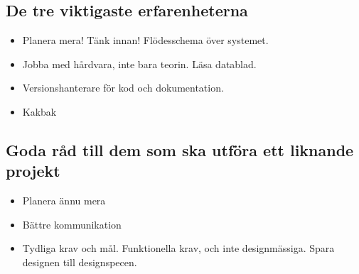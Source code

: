 \documentclass[a4paper,12pt]{article}
\begin{document}
\subsection{De tre viktigaste erfarenheterna}
\begin{itemize}
\item Planera mera! Tänk innan! Flödesschema över systemet.
\item Jobba med hårdvara, inte bara teorin. Läsa datablad. 
\item Versionshanterare för kod och dokumentation. 
\item Kakbak
\end{itemize}

\subsection{Goda råd till dem som ska utföra ett liknande projekt}
\begin{itemize}
\item Planera ännu mera
\item Bättre kommunikation
\item Tydliga krav och mål. Funktionella krav, och inte designmässiga. Spara designen till designspecen. 
\end{itemize}
\end{document}
